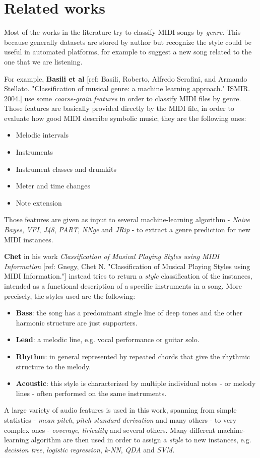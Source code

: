 \documentclass[a4paper]{article}
\begin{document}
	
	\section{Related works}
	\lettrine[nindent=0em,lines=2]{M}{}ost of the works in the literature try to classify MIDI songs by \textit{genre}. This because generally datasets are stored by author but recognize the style could be useful in automated platforms, for example to suggest a new song related to the one that we are listening. 
	
	For example, \textbf{Basili et al} [ref: Basili, Roberto, Alfredo Serafini, and Armando Stellato. "Classification of musical genre: a machine learning approach." ISMIR. 2004.] use some \textit{coarse-grain features} in order to classify MIDI files by genre. Those features are basically provided directly by the MIDI file, in order to evaluate how good MIDI describe symbolic music; they are the following ones:
	\begin{itemize}
		\item Melodic intervals
		\item Instruments
		\item Instrument classes and drumkits
		\item Meter and time changes
		\item Note extension
	\end{itemize}
	Those features are given as input to several machine-learning algorithm - \textit{Naive Bayes}, \textit{VFI}, \textit{J48}, \textit{PART}, \textit{NNge} and \textit{JRip} - to extract a genre prediction for new MIDI instances.
	
	\textbf{Chet} in his work \textit{Classification of Musical Playing Styles using MIDI Information} [ref: Gnegy, Chet N. "Classification of Musical Playing Styles using MIDI Information."] instead tries to return a \textit{style} classification of the instances, intended as a functional description of a specific instruments in a song. More precisely, the styles used are the following: 
	\begin{itemize}
		\item \textbf{Bass}: the song has a predominant single line of deep tones and the other harmonic structure are just supporters.
		\item \textbf{Lead}: a melodic line, e.g. vocal performance or guitar solo.
		\item \textbf{Rhythm}: in general represented by repeated chords that give the rhythmic structure to the melody.
		\item \textbf{Acoustic}: this style is characterized by multiple individual notes - or melody lines - often performed on the same instruments.
	\end{itemize}
	A large variety of audio features is used in this work, spanning from simple statistics - \textit{mean pitch}, \textit{pitch standard derivation} and many others - to very complex ones - \textit{coverage}, \textit{liricality} and several others. Many different machine-learning algorithm are then used in order to assign a \textit{style} to new instances, e.g. \textit{decision tree}, \textit{logistic regression}, \textit{k-NN}, \textit{QDA} and \textit{SVM}.
\end{document}
